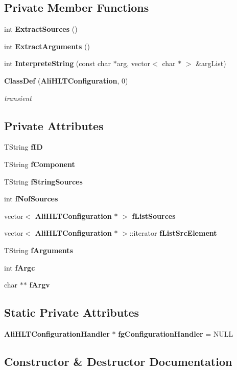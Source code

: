 \subsection*{Private Member Functions}
\begin{CompactItemize}
\item 
int {\bf Extract\-Sources} ()
\item 
int {\bf Extract\-Arguments} ()
\item 
int {\bf Interprete\-String} (const char $\ast$arg, vector$<$ char $\ast$ $>$ \&arg\-List)
\item 
{\bf Class\-Def} ({\bf Ali\-HLTConfiguration}, 0)
\begin{CompactList}\small\item\em transient \item\end{CompactList}\end{CompactItemize}
\subsection*{Private Attributes}
\begin{CompactItemize}
\item 
TString {\bf f\-ID}
\item 
TString {\bf f\-Component}
\item 
TString {\bf f\-String\-Sources}
\item 
int {\bf f\-Nof\-Sources}
\item 
vector$<$ {\bf Ali\-HLTConfiguration} $\ast$ $>$ {\bf f\-List\-Sources}
\item 
vector$<$ {\bf Ali\-HLTConfiguration} $\ast$ $>$::iterator {\bf f\-List\-Src\-Element}
\item 
TString {\bf f\-Arguments}
\item 
int {\bf f\-Argc}
\item 
char $\ast$$\ast$ {\bf f\-Argv}
\end{CompactItemize}
\subsection*{Static Private Attributes}
\begin{CompactItemize}
\item 
{\bf Ali\-HLTConfiguration\-Handler} $\ast$ {\bf fg\-Configuration\-Handler} = NULL
\end{CompactItemize}


\subsection{Constructor \& Destructor Documentation}
